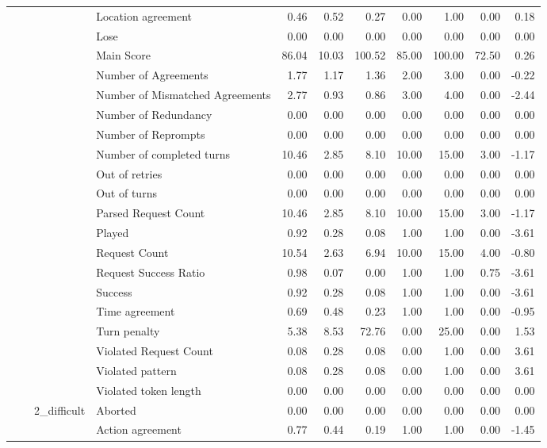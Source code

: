 \begin{tabular}{llllrrrrrrr}
 &  &  & Location agreement & 0.46 & 0.52 & 0.27 & 0.00 & 1.00 & 0.00 & 0.18 \\
 &  &  & Lose & 0.00 & 0.00 & 0.00 & 0.00 & 0.00 & 0.00 & 0.00 \\
 &  &  & Main Score & 86.04 & 10.03 & 100.52 & 85.00 & 100.00 & 72.50 & 0.26 \\
 &  &  & Number of Agreements & 1.77 & 1.17 & 1.36 & 2.00 & 3.00 & 0.00 & -0.22 \\
 &  &  & Number of Mismatched Agreements & 2.77 & 0.93 & 0.86 & 3.00 & 4.00 & 0.00 & -2.44 \\
 &  &  & Number of Redundancy & 0.00 & 0.00 & 0.00 & 0.00 & 0.00 & 0.00 & 0.00 \\
 &  &  & Number of Reprompts & 0.00 & 0.00 & 0.00 & 0.00 & 0.00 & 0.00 & 0.00 \\
 &  &  & Number of completed turns & 10.46 & 2.85 & 8.10 & 10.00 & 15.00 & 3.00 & -1.17 \\
 &  &  & Out of retries & 0.00 & 0.00 & 0.00 & 0.00 & 0.00 & 0.00 & 0.00 \\
 &  &  & Out of turns & 0.00 & 0.00 & 0.00 & 0.00 & 0.00 & 0.00 & 0.00 \\
 &  &  & Parsed Request Count & 10.46 & 2.85 & 8.10 & 10.00 & 15.00 & 3.00 & -1.17 \\
 &  &  & Played & 0.92 & 0.28 & 0.08 & 1.00 & 1.00 & 0.00 & -3.61 \\
 &  &  & Request Count & 10.54 & 2.63 & 6.94 & 10.00 & 15.00 & 4.00 & -0.80 \\
 &  &  & Request Success Ratio & 0.98 & 0.07 & 0.00 & 1.00 & 1.00 & 0.75 & -3.61 \\
 &  &  & Success & 0.92 & 0.28 & 0.08 & 1.00 & 1.00 & 0.00 & -3.61 \\
 &  &  & Time agreement & 0.69 & 0.48 & 0.23 & 1.00 & 1.00 & 0.00 & -0.95 \\
 &  &  & Turn penalty & 5.38 & 8.53 & 72.76 & 0.00 & 25.00 & 0.00 & 1.53 \\
 &  &  & Violated Request Count & 0.08 & 0.28 & 0.08 & 0.00 & 1.00 & 0.00 & 3.61 \\
 &  &  & Violated pattern & 0.08 & 0.28 & 0.08 & 0.00 & 1.00 & 0.00 & 3.61 \\
 &  &  & Violated token length & 0.00 & 0.00 & 0.00 & 0.00 & 0.00 & 0.00 & 0.00 \\
\cline{3-11}
 &  & \multirow[t]{27}{*}{2_difficult} & Aborted & 0.00 & 0.00 & 0.00 & 0.00 & 0.00 & 0.00 & 0.00 \\
 &  &  & Action agreement & 0.77 & 0.44 & 0.19 & 1.00 & 1.00 & 0.00 & -1.45 \\

\end{tabular}
